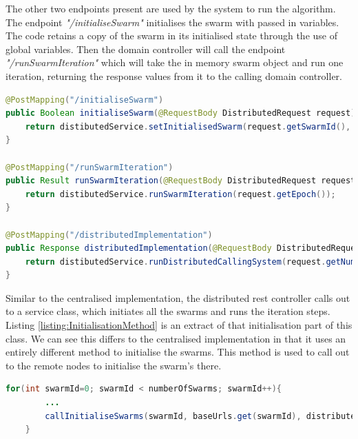 \documentclass[oneside,12pt]{book}
\begin{document}
The other two endpoints present are used by the system to run the algorithm. The endpoint \textit{"/initialiseSwarm"} initialises the swarm with passed in variables. The code retains a copy of the swarm in its initialised state through the use of global variables. Then the domain controller will call the endpoint \textit{"/runSwarmIteration"} which will take the in memory swarm object and run one iteration, returning the response values from it to the calling domain controller.

\begin{lstlisting}[basicstyle=\footnotesize, language=Java]
 @PostMapping("/initialiseSwarm")
public Boolean initialiseSwarm(@RequestBody DistributedRequest request) throws Exception {
    return distibutedService.setInitialisedSwarm(request.getSwarmId(), request.getNumberOfParticles(), request.getConfigVariables());
}

@PostMapping("/runSwarmIteration")
public Result runSwarmIteration(@RequestBody DistributedRequest request) {
    return distibutedService.runSwarmIteration(request.getEpoch());
}

@PostMapping("/distributedImplementation")
public Response distributedImplementation(@RequestBody DistributedRequest request) {
    return distibutedService.runDistributedCallingSystem(request.getNumberOfParticles(), request.getBaseUrls(), request.getConfigVariables());
}
\end{lstlisting}
\label{listing:DistributedRestController}

Similar to the centralised implementation, the distributed rest controller calls out to a service class, which initiates all the swarms and runs the iteration steps. Listing \ref{listing:InitialisationMethod} is an extract of that initialisation part of this class. We can see this differs to the centralised implementation in that it uses an entirely different method to initialise the swarms. This method is used to call out to the remote nodes to initialise the swarm's there.

\begin{lstlisting}[basicstyle=\footnotesize, language=Java]
    for(int swarmId=0; swarmId < numberOfSwarms; swarmId++){
        ...
        callInitialiseSwarms(swarmId, baseUrls.get(swarmId), distributedRequest);
    }
\end{lstlisting}
\label{listing:InitialisationMethod}
\end{document}
